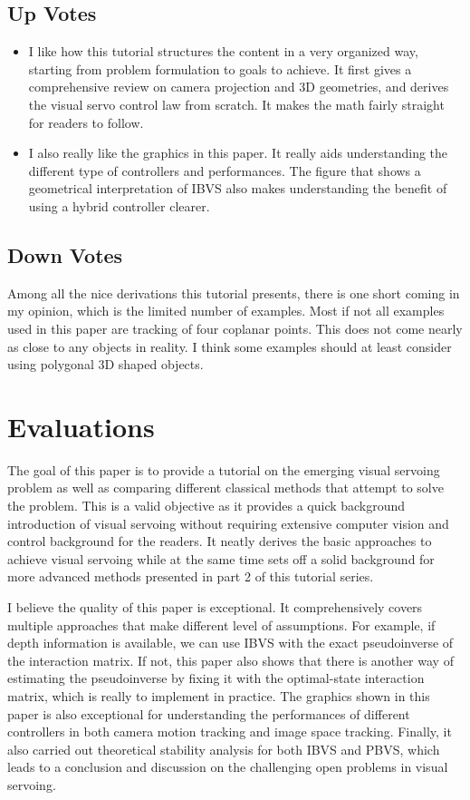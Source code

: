 \documentclass[10pt, twocolumn]{article}
\begin{document}
\subsection{Up Votes}
\begin{itemize}
  \item I like how this tutorial structures the content in a very
    organized way, starting from problem formulation to goals to achieve.
    It first gives a comprehensive review on camera projection and 3D geometries,
    and derives the visual servo control law from scratch. It makes the math
    fairly straight for readers to follow.

  \item I also really like the graphics in this paper. It really aids understanding
    the different type of controllers and performances. The figure that
    shows a geometrical interpretation of IBVS also makes understanding
    the benefit of using a hybrid controller clearer.
\end{itemize}

\subsection{Down Votes}
Among all the nice derivations this tutorial presents, there is one
short coming in my opinion, which is the limited number of examples.
Most if not all examples used in this paper are tracking of four coplanar
points. This does not come nearly as close to any objects in reality. I think
some examples should at least consider using polygonal 3D shaped objects.

\section{Evaluations}
The goal of this paper is to provide a tutorial on the emerging visual servoing
problem as well as comparing different classical methods that attempt to solve
the problem. This is a valid objective as it provides a quick background
introduction of visual servoing
without requiring extensive computer vision and control background for the readers.
It neatly derives the basic approaches to achieve visual servoing while at the
same time sets off a solid background for more advanced methods presented in
part 2 of this tutorial series.

I believe the quality of this paper is exceptional. It comprehensively covers
multiple approaches that make different level of assumptions. For example, if
depth information is available, we can use IBVS with the exact pseudoinverse
of the interaction matrix. If not, this paper also shows that there is another
way of estimating the pseudoinverse by fixing it with the optimal-state
interaction matrix, which is really to implement in practice. The graphics
shown in this paper is also exceptional for understanding the performances
of different controllers in both camera motion tracking and image space
tracking. Finally, it also carried out theoretical stability analysis
for both IBVS and PBVS, which leads to a conclusion and discussion
on the challenging open problems in visual servoing.
\end{document}
